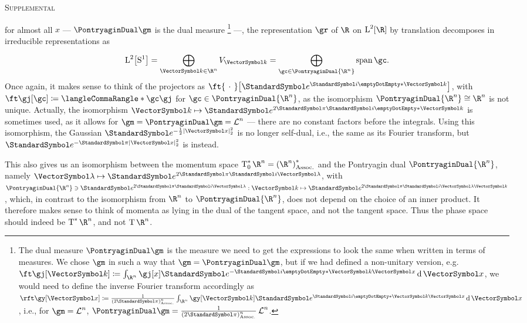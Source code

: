 \documentclass[10pt]{article}
\newcommand{\Rn}{{\R^n}}
\newcommand{\sqftnrm}{\frac{1}{\pa{2\Pi}^n} }
\newenvironment{supplemental}{
\begin{flushright}
\textsc{Supplemental}
\end{flushright}}{}
\begin{document}
\begin{supplemental}
for almost all $x$ --- $\PontryaginDual\gm$ is the dual measure
\footnote{The dual measure $\PontryaginDual\gm$ is the measure we need to get the
  expressions to look the same when written in terms of measures. We chose $\gm$ in such
  a way that $\gm = \PontryaginDual\gm$, but if we had defined a non-unitary version, e.g.
  $\ft\gj\of \vk \DefineAs \int \Rn \gj\of x \E^{-\I \scal\vk \vx}\diffd \vx$, we would  
  need to define the inverse Fourier transform accordingly as
  $\rft\gy\of\vx\DefineAs\sqftnrm \int\Rn\gy\of\vk\E^{\I\scal\vk\vx}\diffd\vx$, i.e., for
  $\gm=\LebesgueMeasure n$, $\PontryaginDual \gm = \sqftnrm \LebesgueMeasure n$.}
---, the representation $\gr$ of $\R$ on $\Lspace[2]\of\R$ by translation decomposes in irreducible representations as
\begin{equation*}
  \Lspace[2]\of{\UnitSphere 1}=\DirectSum{\vk\in\Rn}
  V_\vk=\DirectSum{\gc\in\PontryaginDual{\Rn}} \LinearSpan \gc .
\end{equation*}
Once again, it makes sense to think of the projectors as  $\ft{\placeholder}\of{\E^{\I \scal\vk{}}}$, with $\ft\gj\of\gc \DefineAs \LTwoInner \gc \gj$ for $\gc\in\PontryaginDual\Rn$, as the isomorphism $\PontryaginDual\Rn\Isomorphic\Rn$ is not unique. Actually, the isomorphism $\FunctionBody \vk {\E^{2 \Pi \I \scal{\vk}{} }}$ is sometimes used, as it allows for $\gm = \PontryaginDual\gm = \LebesgueMeasure n$ --- there are no constant factors before the integrals. Using this isomorphism, the Gaussian $\E^{-\frac{1}{2}\norm\vx^2}$ is no longer self-dual, i.e., the same as its Fourier transform, but $\E^{-\Pi\norm\vx^2}$ is instead.

This also gives us an isomorphism between the momentum space $\CotangentSpace 0 \Rn = \Dual{\pa\Rn}$ and the Pontryagin dual $\PontryaginDual \Rn$, namely $\FunctionBody \vgl {\E^{2 \Pi \I \vgl }}$, with $\PontryaginDual \Rn\owns\FunctionNamedBody{\E^{2 \Pi \I \vgl}} \vk {\E^{2 \Pi \I \vgl\vk}}$, which, in contrast to the isomorphism from $\Rn$ to $\PontryaginDual\Rn$, does not depend on the choice of an inner product. It therefore makes sense to think of momenta as lying in the dual of the tangent space, and not the tangent space. Thus the phase space should indeed be $\CotangentBundle \Rn$, and not $\TangentBundle \Rn$.


\end{supplemental}
\end{document}
